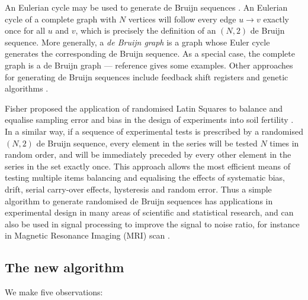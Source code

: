 \documentclass[12pt]{article}
\begin{document}
An Eulerian cycle may be used to generate de Bruijn sequences \cite{fleury,hierholzer}. An Eulerian cycle of a complete graph with $N$ vertices will follow every edge $u \rightarrow v$ exactly once for all $u$ and $v$, which is precisely the definition of an $(N,2)$ de Bruijn sequence. More generally, a \emph{de Bruijn graph\/} is a graph whose Euler cycle generates the corresponding de Bruijn sequence. As a special case, the complete graph is a de Bruijn graph --- reference \cite{good} gives some examples. Other approaches for generating de Bruijn sequences include feedback shift registers and genetic algorithms \cite{turan,knuth4a}.%

Fisher proposed the application of randomised Latin Squares to balance and equalise sampling error and bias in the design of experiments into soil fertility \cite{fisher}. 
In a similar way, if a sequence of experimental tests is prescribed by a randomised $(N,2)$ de Bruijn sequence, every element in the series will be tested $N$ times in random order, and will be immediately preceded by every other element in the series in the set exactly once. This approach allows the most efficient means of testing multiple items balancing and equalising the effects of systematic bias, drift, serial carry-over effects, hysteresis and random error. Thus a simple algorithm to generate randomised de Bruijn sequences has applications in experimental design in many areas of scientific and statistical research,  and can also be used in signal processing to improve the signal to noise ratio, for instance in Magnetic Resonance Imaging (MRI) scan \cite{aguirre}.

\subsection{The new algorithm}

\def\pair#1#2{\ifx #1#2
#1\rightarrow #2 %
\else #1\rightarrow#2\rightarrow#1\fi}

We make five observations:
\end{document}
